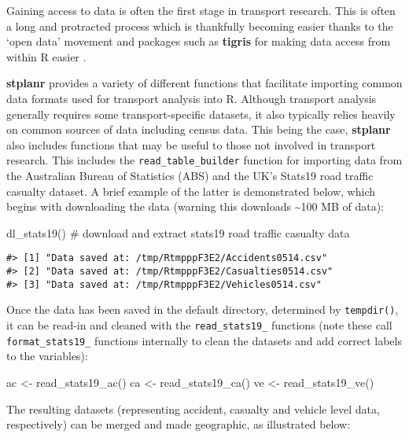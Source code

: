 Gaining access to data is often the first stage in transport research.
This is often a long and protracted process which is thankfully becoming
easier thanks to the `open data' movement and packages such as
\textbf{tigris} for making data access from within R easier
\citep{walker_tigris:_2016}.

\textbf{stplanr} provides a variety of different functions that
facilitate importing common data formats used for transport analysis
into R. Although transport analysis generally requires some
transport-specific datasets, it also typically relies heavily on common
sources of data including census data. This being the case,
\textbf{stplanr} also includes functions that may be useful to those not
involved in transport research. This includes the
\texttt{read\_table\_builder} function for importing data from the
Australian Bureau of Statistics (ABS) and the UK's Stats19 road traffic
casualty dataset. A brief example of the latter is demonstrated below,
which begins with downloading the data (warning this downloads
\textasciitilde{}100 MB of data):

\begin{Schunk}
\begin{Sinput}
dl_stats19() # download and extract stats19 road traffic casualty data
\end{Sinput}
\end{Schunk}

\begin{verbatim}
#> [1] "Data saved at: /tmp/RtmpppF3E2/Accidents0514.csv"
#> [2] "Data saved at: /tmp/RtmpppF3E2/Casualties0514.csv"
#> [3] "Data saved at: /tmp/RtmpppF3E2/Vehicles0514.csv"  
\end{verbatim}

Once the data has been saved in the default directory, determined by
\texttt{tempdir()}, it can be read-in and cleaned with the
\texttt{read\_stats19\_} functions (note these call
\texttt{format\_stats19\_} functions internally to clean the datasets
and add correct labels to the variables):

\begin{Schunk}
\begin{Sinput}
ac <- read_stats19_ac()
ca <- read_stats19_ca()
ve <- read_stats19_ve()
\end{Sinput}
\end{Schunk}

The resulting datasets (representing accident, casualty and vehicle
level data, respectively) can be merged and made geographic, as
illustrated below:

